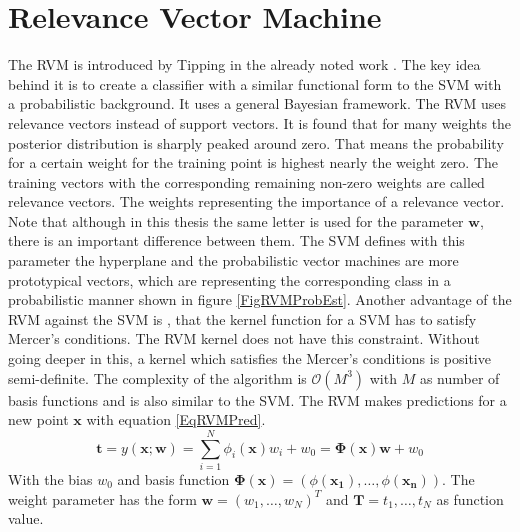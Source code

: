\section{Relevance Vector Machine}\label{PcSecRVM}
The \ac{RVM} is introduced by Tipping in the already noted work \cite{Tipping.2001}.
The key idea behind it is to create a classifier with a similar functional form to the \ac{SVM} with a probabilistic background. 
It uses a general Bayesian framework.\newline
The \acs{RVM} uses relevance vectors instead of support vectors.
It is found that for many weights the posterior distribution is sharply peaked around zero.
That means the probability for a certain weight for the training point is highest nearly the weight zero.
The training vectors with the corresponding remaining non-zero weights are called relevance vectors.
The weights representing the importance of a relevance vector.\cite[p. 213]{Tipping.2001}
Note that although in this thesis the same letter is used for the parameter $\mathbf{w}$, there is an important difference between them.
The \acs{SVM} defines with this parameter the hyperplane and the probabilistic vector machines are more prototypical vectors, which are representing the corresponding class in a probabilistic manner shown in figure \ref{FigRVMProbEst}.\cite[p. 222]{Tipping.2001}\newline
Another advantage of the \acs{RVM} against the \acs{SVM} is , that the kernel function for a \acs{SVM} has to satisfy Mercer's conditions.
The \ac{RVM} kernel does not have this constraint.\cite[p. 213]{Tipping.2001}\newline
Without going deeper in this, a kernel which satisfies the Mercer's conditions is positive semi-definite.\cite{Graepel.2002}
The complexity of the algorithm is $\mathcal{O}(M^3)$ with $M$ as number of basis functions and is also similar to the \ac{SVM}.\cite[p. 236-237]{Tipping.2001}\newline
The \ac{RVM} makes predictions for a new point $\mathbf{x}$ with equation \ref{EqRVMPred}.\cite[p. 211]{Tipping.2001}
\begin{equation}\label{EqRVMPred}
	\mathbf{t} = y(\mathbf{x};\mathbf{w}) = \sum_{i=1}^{N}\phi_i(\mathbf{x})w_i + w_0 = \boldsymbol{\Phi}(\mathbf{x})\mathbf{w} + w_0
\end{equation}
With the bias $w_0$ and basis function $\boldsymbol{\Phi}(\mathbf{x}) = (\phi(\mathbf{x_1}),\dots,\phi(\mathbf{x_n}))$.
The weight parameter has the form $\mathbf{w} = (w_1,\dots,w_N)^T$ and $\mathbf{T}={t_1,\dots,t_N}$ as function value.\\
